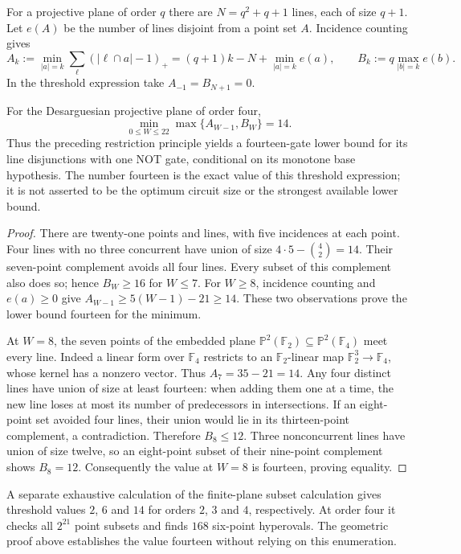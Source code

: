 For a projective plane of order $q$ there are $N=q^2+q+1$ lines, each of size $q+1$. Let $e(A)$ be the number of lines disjoint from a point set $A$. Incidence counting gives
\[
 A_k:=\min_{|a|=k}\sum_{\ell}(|\ell\cap a|-1)_+
       =(q+1)k-N+\min_{|a|=k}e(a),
 \qquad B_k:=q\max_{|b|=k}e(b).
\]
In the threshold expression take $A_{-1}=B_{N+1}=0$.

\begin{proposition}\label{prop:plane-four-threshold}
For the Desarguesian projective plane of order four,
\[
 \min_{0\leq W\leq22}\max\{A_{W-1},B_W\}=14.
\]
Thus the preceding restriction principle yields a fourteen-gate lower bound for its line disjunctions with one NOT gate, conditional on its monotone base hypothesis. The number fourteen is the exact value of this threshold expression; it is not asserted to be the optimum circuit size or the strongest available lower bound.
\end{proposition}
\begin{proof}
There are twenty-one points and lines, with five incidences at each point. Four lines with no three concurrent have union of size $4\cdot5-\binom42=14$. Their seven-point complement avoids all four lines. Every subset of this complement also does so; hence $B_W\geq16$ for $W\leq7$.
For $W\geq8$, incidence counting and $e(a)\geq0$ give
$A_{W-1}\geq5(W-1)-21\geq14$. These two observations prove the lower bound fourteen for the minimum.

At $W=8$, the seven points of the embedded plane $\mathbb P^2(\mathbb F_2)\subseteq\mathbb P^2(\mathbb F_4)$ meet every line. Indeed a linear form over $\mathbb F_4$ restricts to an $\mathbb F_2$-linear map $\mathbb F_2^3\to\mathbb F_4$, whose kernel has a nonzero vector. Thus $A_7=35-21=14$.
Any four distinct lines have union of size at least fourteen: when adding them one at a time, the new line loses at most its number of predecessors in intersections. If an eight-point set avoided four lines, their union would lie in its thirteen-point complement, a contradiction. Therefore $B_8\leq12$. Three nonconcurrent lines have union of size twelve, so an eight-point subset of their nine-point complement shows $B_8=12$. Consequently the value at $W=8$ is fourteen, proving equality.
\end{proof}

A separate exhaustive calculation of the finite-plane subset calculation gives threshold values $2$, $6$ and $14$ for orders $2$, $3$ and $4$, respectively. At order four it checks all $2^{21}$ point subsets and finds $168$ six-point hyperovals. The geometric proof above establishes the value fourteen without relying on this enumeration.
